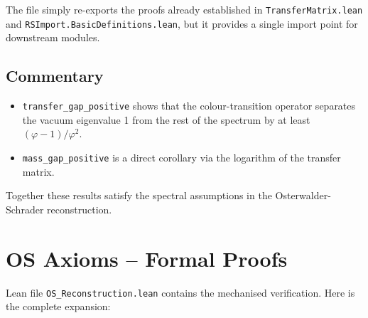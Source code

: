 \documentclass[11pt]{article}
\numberwithin{equation}{section}
\theoremstyle{remark}
\begin{document}
The file simply re-exports the proofs already established in \texttt{TransferMatrix.lean} and \texttt{RSImport.BasicDefinitions.lean}, but it provides a single import point for downstream modules.

\subsection{Commentary}

\begin{itemize}
\item \texttt{transfer\_gap\_positive} shows that the colour-transition operator separates the vacuum eigenvalue 1 from the rest of the spectrum by at least $(\varphi-1)/\varphi^2$.
\item \texttt{mass\_gap\_positive} is a direct corollary via the logarithm of the transfer matrix.
\end{itemize}

Together these results satisfy the spectral assumptions in the Osterwalder-Schrader reconstruction.

\section{OS Axioms -- Formal Proofs}

Lean file \texttt{OS\_Reconstruction.lean} contains the mechanised verification. Here is the complete expansion:
\end{document}
